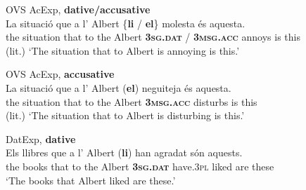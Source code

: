 \documentclass[output=paper,colorlinks,citecolor=brown,modfonts,nonflat]{langsci/langscibook}
\begin{document}
\ea%
 \label{ex:royo:10}
 \ea  OVS AcExp, \textbf{dative/accusative} \label{ex:royo:10a}\\
 \gll  La situació que a l’ Albert \{\textbf{li} / \textbf{el}\} molesta és aquesta.\\
	 the situation that to the Albert \textbf{\textsc{3sg.dat}} / \textbf{\textsc{3msg.acc}} annoys is this\\
 \glt (lit.) ‘The situation that to Albert is annoying is this.’

 \ex OVS AcExp, \textbf{accusative}\label{ex:royo:10b}\\
 \gll La  situació  que a  l’ Albert (\textbf{el}) neguiteja és aquesta.\\
  the situation that to the Albert \textbf{\textsc{3msg.acc}} disturbs is this\\
 \glt (lit.) ‘The situation that to Albert is disturbing is this.’

 \ex  DatExp, \textbf{dative} \label{ex:royo:10c}\\
 \gll Els llibres que a l’ Albert (\textbf{li}) han agradat són aquests.\\
  the books that to the Albert \textbf{\textsc{3sg.dat}} have.\textsc{3pl} liked are these\\
 \glt ‘The books that Albert liked are these.’
\end{document}
